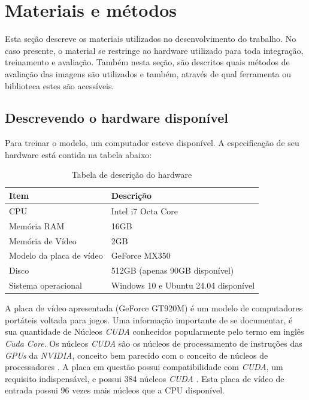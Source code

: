 \section{Materiais e métodos}
Esta seção descreve os materiais utilizados no desenvolvimento do trabalho. No caso presente, o material se restringe ao hardware utilizado para toda integração, treinamento e avaliação. Também nesta seção, são descritos quais métodos de avaliação das imagens são utilizados e também, através de qual ferramenta ou biblioteca estes são acessíveis. 

\subsection{Descrevendo o hardware disponível}

Para treinar o modelo, um computador esteve disponível. A especificação de seu hardware está contida na tabela abaixo:

\begin{table}[H]
    \centering
    \caption{Tabela de descrição do hardware}
    \begin{tabular}{|l|l|} \hline
        \textbf{Item}            & \textbf{Descrição}                    \\ \hline
        CPU                      & Intel i7 Octa Core                    \\ \hline
        Memória RAM              & 16GB                                  \\ \hline
        Memória de Vídeo         & 2GB                                   \\ \hline
        Modelo da placa de vídeo & GeForce MX350                         \\ \hline
        Disco                    & 512GB (apenas 90GB disponível)        \\ \hline
        Sistema operacional      & Windows 10 e Ubuntu 24.04 disponível  \\ \hline
    \end{tabular}
    \vspace{0.3cm}
    \label{tab:my_label}
\end{table}

A placa de vídeo apresentada (GeForce GT920M) é um modelo de computadores portáteis voltada para jogos. Uma informação importante de se documentar, é sua quantidade de Núcleos \textit{CUDA} conhecidos popularmente pelo termo em inglês \textit{Cuda Core}. Os núcleos \textit{CUDA} são os núcleos de processamento de instruções das \textit{GPUs} da \textit{NVIDIA}, conceito bem parecido com o conceito de núcleos de processadores \cite{ryles_what_2022}. A placa em questão possui compatibilidade com \textit{CUDA}, um requisito indispensável, e possui 384 núcleos \textit{CUDA} \cite{nvidia_geforce_2022, technical_city_nvidia_2022}. Esta placa de vídeo de entrada possui 96 vezes mais núcleos que a CPU disponível.

